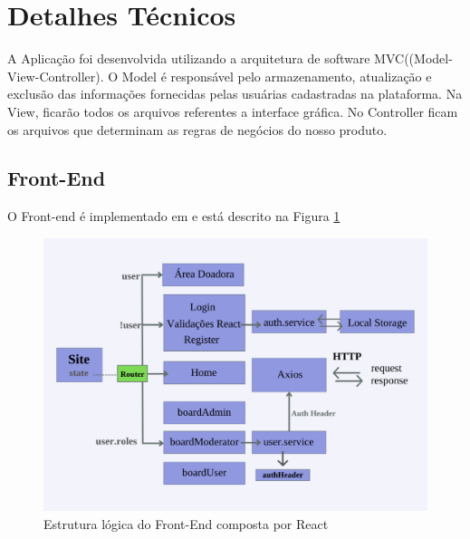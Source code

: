 \section{Detalhes Técnicos}
\label{sec:tech}

A Aplicação foi desenvolvida utilizando a arquitetura de software MVC((Model-View-Controller).
O Model é responsável pelo armazenamento, atualização e exclusão das informações fornecidas pelas usuárias cadastradas na plataforma.
Na View, ficarão todos os arquivos referentes a interface gráfica.
No Controller ficam os arquivos que determinam as regras de negócios do nosso produto.

\subsection{Front-End}
O Front-end é implementado em \cite{React} e está descrito na Figura \ref{fig:logicFront}

\begin{figure}[h!]
    \centering
    \includegraphics[width=1.0\textwidth]{Figuras/Frontpdf.pdf}
    \caption{Estrutura lógica do Front-End composta por React}
    \label{fig:logicFront}
\end{figure}

